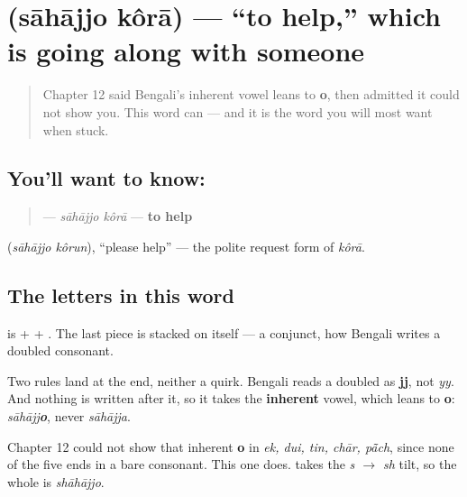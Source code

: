 \section[\texorpdfstring{\bn{সাহায্য} \bn{করা} (sāhājjo kôrā)}{সাহায্য করা (sāhājjo kôrā)}]{  (sāhājjo kôrā) — \textquotedblleft{}to help,\textquotedblright{} which is going along with someone}

\label{lesson:BN-C09-sahajjo-kora}



\begin{quote}
Chapter 12 said Bengali's inherent vowel leans to \textbf{o}, then admitted it could not show you. This word can — and it is the word you will most want when stuck.
\end{quote}

\subsection*{You'll want to know:  }
\begin{quote}
\textbf{ } — \emph{sāhājjo kôrā} — \textbf{to help}
\end{quote}

  (\emph{sāhājjo kôrun}), \textquotedblleft{}please help\textquotedblright{} — the polite request form of \emph{kôrā}.

\subsection*{The letters in this word}
\textbf{} is \textbf{} + \textbf{} + \textbf{}. The last piece is \textbf{} stacked on itself — a conjunct, how Bengali writes a doubled consonant.

\begin{sounds}
Two rules land at the end, neither a quirk. Bengali reads a doubled \textbf{} as \textbf{jj}, not \emph{yy}. And nothing is written after it, so it takes the \textbf{inherent} vowel, which leans to \textbf{o}: \emph{sāhājj\textbf{o}}, never \emph{sāhājja}.

Chapter 12 could not show that inherent \textbf{o} in \emph{ek, dui, tin, chār, pā̃ch}, since none of the five ends in a bare consonant. This one does. \textbf{} takes the \emph{s $\to$ sh} tilt, so the whole is \emph{shāhājjo}.
\end{sounds}

